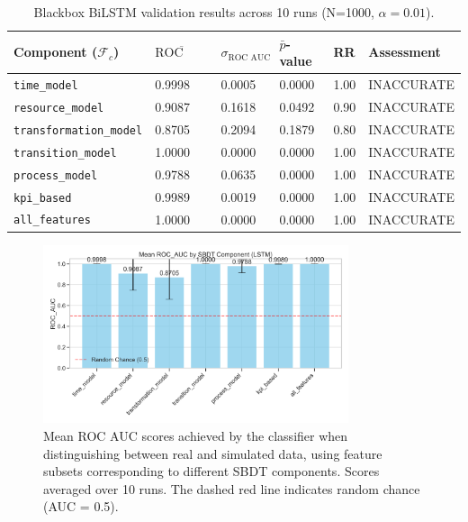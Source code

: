 \begin{table}[htbp]
  \centering
  \caption{Blackbox BiLSTM validation results across 10 runs (N=1000, $\alpha=0.01$).}
  \label{tab:results-blackbox}
  \begin{tabular}{l l l l l p{3cm}}
    \toprule
    \textbf{Component ($\mathcal{F}_c$)} & \textbf{$\overline{\text{ROC AUC}}$} & \textbf{$\sigma_{\text{ROC AUC}}$} & \textbf{$\bar{p}$-value} & \textbf{RR} & \textbf{Assessment} \\
    \midrule
    \texttt{time\_model}                 & 0.9998                               & 0.0005                             & 0.0000                   & 1.00        & INACCURATE          \\
    \texttt{resource\_model}             & 0.9087                               & 0.1618                             & 0.0492                   & 0.90        & INACCURATE          \\
    \texttt{transformation\_model}       & 0.8705                               & 0.2094                             & 0.1879                   & 0.80        & INACCURATE          \\
    \texttt{transition\_model}           & 1.0000                               & 0.0000                             & 0.0000                   & 1.00        & INACCURATE          \\
    \texttt{process\_model}              & 0.9788                               & 0.0635                             & 0.0000                   & 1.00        & INACCURATE          \\
    \texttt{kpi\_based}                  & 0.9989                               & 0.0019                             & 0.0000                   & 1.00        & INACCURATE          \\
    \texttt{all\_features}               & 1.0000                               & 0.0000                             & 0.0000                   & 1.00        & INACCURATE          \\
    \bottomrule
  \end{tabular}
\end{table}

\begin{figure}[htbp]
  \centering
  \includegraphics[width=0.8\textwidth]{figures/lstm-roc-auc-by-component.png}
  \caption{Mean ROC AUC scores achieved by the classifier when distinguishing between real and simulated data, using feature subsets corresponding to different SBDT components. Scores averaged over 10 runs. The dashed red line indicates random chance (AUC = 0.5).}
  \label{fig:bilstm-roc-auc}
\end{figure}


